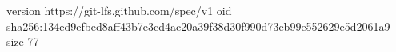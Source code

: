 version https://git-lfs.github.com/spec/v1
oid sha256:134ed9efbed8aff43b7e3cd4ac20a39f38d30f990d73eb99e552629e5d2061a9
size 77
